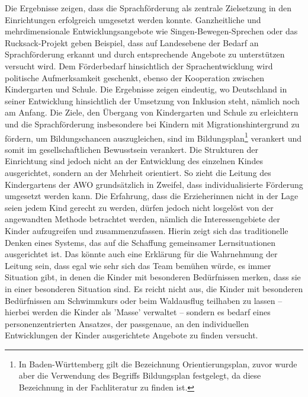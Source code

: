 Die Ergebnisse zeigen, dass die Sprachförderung als zentrale Zielsetzung in den Einrichtungen erfolgreich umgesetzt werden konnte. Ganzheitliche und mehrdimensionale Entwicklungsangebote wie Singen-Bewegen-Sprechen oder das Rucksack-Projekt geben Beispiel, dass auf Landesebene der Bedarf an Sprachförderung erkannt und durch entsprechende Angebote zu unterstützen versucht wird. Dem Förderbedarf hinsichtlich der Sprachentwicklung wird politische Aufmerksamkeit geschenkt, ebenso der Kooperation zwischen Kindergarten und Schule. 
Die Ergebnisse zeigen eindeutig, wo Deutschland in seiner Entwicklung hinsichtlich der Umsetzung von Inklusion steht, nämlich noch am Anfang.
Die Ziele, den Übergang von Kindergarten und Schule zu erleichtern und die Sprachförderung insbesondere bei Kindern mit Migrationshintergrund zu fördern, um Bildungschancen auszugleichen, sind im Bildungsplan\footnote{In Baden-Württemberg gilt die Bezeichnung Orientierungsplan, zuvor wurde aber die Verwendung des Begriffs Bildungsplan festgelegt, da diese Bezeichnung in der Fachliteratur zu finden ist.} verankert und somit im gesellschaftlichen Bewusstsein verankert. Die Strukturen der Einrichtung sind jedoch nicht an der Entwicklung des einzelnen Kindes ausgerichtet, sondern an der Mehrheit orientiert.  
So zieht die Leitung des Kindergartens der AWO grundsätzlich in Zweifel, dass individualisierte Förderung umgesetzt werden kann. Die Erfahrung, dass die Erzieherinnen nicht in der Lage seien jedem Kind gerecht zu werden, dürfen jedoch nicht losgelöst von der angewandten Methode betrachtet werden, nämlich die Interessengebiete der Kinder aufzugreifen und zusammenzufassen. Hierin zeigt sich das traditionelle Denken eines Systems, das auf die Schaffung gemeinsamer Lernsituationen ausgerichtet ist. Das könnte auch eine Erklärung für die Wahrnehmung der Leitung sein, dass egal wie sehr sich das Team bemühen würde, es immer Situation gibt, in denen die Kinder mit besonderen Bedürfnissen merken, dass sie in einer besonderen Situation sind. Es reicht nicht aus, die Kinder mit besonderen Bedürfnissen am Schwimmkurs oder beim Waldausflug teilhaben zu lassen -- hierbei werden die Kinder als 'Masse' verwaltet -- sondern es bedarf eines personenzentrierten Ansatzes, der passgenaue, an den individuellen Entwicklungen der Kinder ausgerichtete Angebote zu finden versucht.

